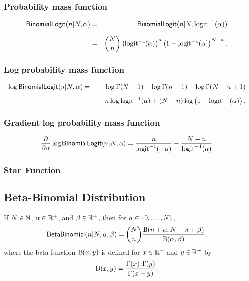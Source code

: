\subsubsection{Probability mass function}
\begin{eqnarray*}
\mbox{\sf BinomialLogit}(n|N,\alpha)
& = & \mbox{\sf BinomialLogit}(n|N,\mbox{logit}^{-1}(\alpha))
\\[6pt]
& = & {N \choose n} \left( \mbox{logit}^{-1}(\alpha) \right)^{n}
                    \left( 1 - \mbox{logit}^{-1}(\alpha) \right)^{N - n}.
\end{eqnarray*}
%
\subsubsection{Log probability mass function}
\begin{eqnarray*}
\log \mbox{\sf BinomialLogit}(n|N,\alpha)
& = &
\log \Gamma(N+1) - \log \Gamma(n + 1) - \log \Gamma(N- n + 1)
\\[4pt]
& & { } + n \log \mbox{logit}^{-1}(\alpha) + (N - n) \log \left( 1 -
  \mbox{logit}^{-1}(\alpha) \right), 
\end{eqnarray*}
%
\subsubsection{Gradient log probability mass function}
%
\[
\frac{\partial}{\partial \alpha} \log \mbox{\sf BinomialLogit}(n|N,\alpha)
= \frac{n}{\mbox{logit}^{-1}(-\alpha)}
- \frac{N - n}{\mbox{logit}^{-1}(\alpha)}
\]
%
\subsubsection{Stan Function}
%
\begin{description}
%
%
\end{description}


\subsection{Beta-Binomial Distribution}

If $N \in \mathbb{N}$, $\alpha \in \mathbb{R}^+$, and $\beta \in \mathbb{R}^+$,
then for $n \in \{ 0,\ldots,N \}$,
\[
\mbox{\sf BetaBinomial}(n|N,\alpha,\beta)
= 
{N \choose n} \frac{\mbox{B}(n+\alpha, N -n +
  \beta)}{\mbox{B}(\alpha,\beta)},
\]
%
where the beta function $\mbox{B}(x,y)$ is defined for $x \in
\mathbb{R}^+$ and $y \in \mathbb{R}^+$ by
%
\[
\mbox{B}(x,y)
= \frac{\Gamma(x) \ \Gamma(y)}{\Gamma(x + y)}.
\]

